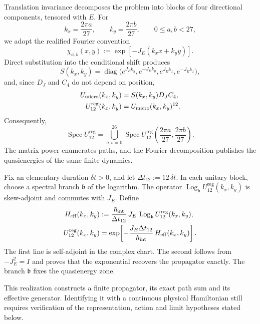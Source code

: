 Translation invariance decomposes the problem into blocks of four
directional components, tensored with \(E\). For
\[
 k_x=\frac{2\pi a}{27},
 \qquad
 k_y=\frac{2\pi b}{27},
 \qquad 0\leq a,b<27,
\]
we adopt the realified Fourier convention
\[
 \chi_{a,b}(x,y)
 :=\exp[-J_E(k_xx+k_yy)].
\]
Direct substitution into the conditional shift produces
\[
 S(k_x,k_y)
 =\operatorname{diag}
 \bigl(
  e^{J_Ek_y},e^{-J_Ek_y},
  e^{J_Ek_x},e^{-J_Ek_x}
 \bigr),
\]
and, since \(D_J\) and \(C_4\) do not depend on position,
\begin{equation}
 \begin{aligned}
 U_{\rm micro}(k_x,k_y)
   &=S(k_x,k_y)D_JC_4,\\
 U_{12}^{\mathrm{reg}}(k_x,k_y)
   &=U_{\rm micro}(k_x,k_y)^{12}.
 \end{aligned}
 \label{eq:bloques-fourier-registro-27-rev3}
\end{equation}
Consequently,
\[
 \operatorname{Spec}U_{12}^{\mathrm{reg}}
 =
 \bigcup_{a,b=0}^{26}
 \operatorname{Spec}
 U_{12}^{\mathrm{reg}}
 \left(\frac{2\pi a}{27},\frac{2\pi b}{27}\right).
\]
The matrix power enumerates paths, and the Fourier decomposition publishes
the quasienergies of the same finite dynamics.

Fix an elementary duration \(\delta t>0\), and let
\(\Delta t_{12}:=12\,\delta t\). In each unitary block, choose a spectral
branch \(\mathfrak b\) of the logarithm. The operator
\(\operatorname{Log}_{\mathfrak b}U_{12}^{\mathrm{reg}}(k_x,k_y)\) is
skew-adjoint and commutes with \(J_E\). Define
\begin{equation}
 \begin{aligned}
 H_{\rm eff}(k_x,k_y)
 &:=
 \frac{\hbar_{\rm int}}{\Delta t_{12}}\,
 J_E\,
 \operatorname{Log}_{\mathfrak b}
 U_{12}^{\mathrm{reg}}(k_x,k_y),\\
 U_{12}^{\mathrm{reg}}(k_x,k_y)
 &=
 \exp\!\left[
  -\frac{J_E\Delta t_{12}}{\hbar_{\rm int}}\,
  H_{\rm eff}(k_x,k_y)
 \right].
 \end{aligned}
 \label{eq:hamiltoniano-efectivo-registro-27-rev3}
\end{equation}
The first line is self-adjoint in the complex chart. The second follows from
\(-J_E^2=I\) and proves that the exponential recovers the
propagator exactly. The branch \(\mathfrak b\) fixes the quasienergy zone.

This realization constructs a finite propagator, its exact path sum and
its effective generator. Identifying it with a continuous physical Hamiltonian
still requires verification of the representation, action and limit hypotheses
stated below.

